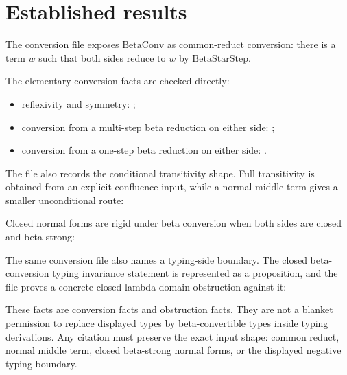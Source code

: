 \section{Established results}
\label{sec:metacic-beta-audit-map-established-results}

The conversion file exposes $\mathrm{BetaConv}$ as common-reduct conversion:
there is a term $w$ such that both sides reduce to $w$ by
$\mathrm{BetaStarStep}$.

The elementary conversion facts are checked directly:
\begin{itemize}
\item reflexivity and symmetry:
  ;
\item conversion from a multi-step beta reduction on either side:
  ;
\item conversion from a one-step beta reduction on either side:
  .
\end{itemize}

The file also records the conditional transitivity shape. Full transitivity is
obtained from an explicit confluence input, while a normal middle term gives a
smaller unconditional route:

Closed normal forms are rigid under beta conversion when both sides are closed
and beta-strong:

The same conversion file also names a typing-side boundary. The closed
beta-conversion typing invariance statement is represented as a proposition,
and the file proves a concrete closed lambda-domain obstruction against it:

These facts are conversion facts and obstruction facts. They are not a blanket
permission to replace displayed types by beta-convertible types inside typing
derivations. Any citation must preserve the exact input shape: common reduct,
normal middle term, closed beta-strong normal forms, or the displayed negative
typing boundary.


